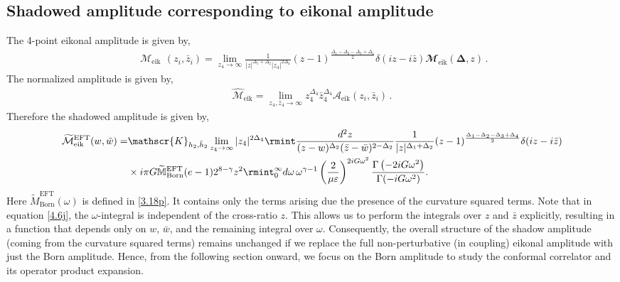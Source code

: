\subsection{Shadowed amplitude corresponding to eikonal amplitude }
The 4-point eikonal amplitude is given by,
\begin{align}
    \begin{split}
        \mathcal{M}_{\textrm{eik}}
    \end{split}(z_i,\bar z_i)=\lim_{z_4\to \infty}\frac{1}{|z|^{\Delta_1+\Delta_2}|z_4|^{2\Delta_4}}(z-1)^{\frac{\Delta_1-\Delta_2-\Delta_3+\Delta_4}{2}}\delta(iz-i\bar z) \mathbfcal{M}_{\textrm{eik}}(\mathbf \Delta,z)\,.
\end{align}
The normalized amplitude is given by,
\begin{align}
\widehat{\mathcal{M}}_{\textrm{eik}}=\lim_{z_4,\bar z_4\to \infty}z_4^{\Delta_4} \bar z_4^{\Delta_4} \mathcal{A}_{\textrm{eik}}(z_i,\bar z_i)\,.
\end{align}
Therefore the shadowed amplitude is given by,
\begin{align}
    \begin{split} \widetilde{\mathcal{M}}_{\textrm{eik}}^{\textrm{EFT}}(w,\bar w)=&\mathscr{K}_{h_2,\bar h_2}\lim_{z_4\to \infty}|z_4|^{2\Delta_4}\rmint \frac{d^2 z}{(z-w)^{\Delta_2}(\bar z-\bar w)^{2-\Delta_2}}\frac{1}{|z|^{\Delta_1+\Delta_2}}(z-1)^{\frac{\Delta_1-\Delta_2-\Delta_3+\Delta_4}{2}}\delta(iz-i\bar z) \\ &
   \times i\pi G \widetilde{\mathbb{M}}^{\textrm{EFT}}_{\textrm{Born}}(e-1)2^{8-\gamma}z^2 \rmint_{0}^{\infty} d\omega\,\omega^{\gamma-1}\left(\frac{2}{\mu\varepsilon}\right)^{2iG\omega^2}\frac{\Gamma\left(-2iG\omega^2\right)}{\Gamma(-iG\omega^2)}.\label{4.6j}
    \end{split}
\end{align}
Here $\widetilde{M}_{\textrm{Born}}^{\textrm{EFT}}(\omega)$ is defined in \eqref{3.18p}. It contains only the terms arising due the presence of the curvature squared terms. Note that in equation \eqref{4.6j}, the $\omega$-integral is independent of the cross-ratio $z$. This allows us to perform the integrals over $z$ and $\bar z$ explicitly, resulting in a function that depends only on $w$, $\bar w$, and the remaining integral over $\omega$. Consequently, the overall structure of the shadow amplitude (coming from the curvature squared terms) remains unchanged if we replace the full non-perturbative (in coupling) eikonal amplitude with just the Born amplitude. Hence, from the following section onward, we focus on the Born amplitude to study the conformal correlator and its operator product expansion.\par


